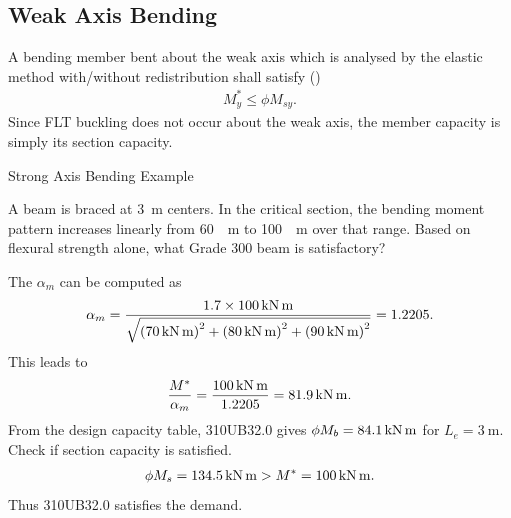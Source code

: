 \subsection{Weak Axis Bending}
A bending member bent about the weak axis which is analysed by the elastic method with/without redistribution shall satisfy ()
\begin{gather}
M^*_y\leqslant\phi{}M_{sy}.
\end{gather}
Since FLT buckling does not occur about the weak axis, the member capacity is simply its section capacity.
\begin{exmp}
Strong Axis Bending Example

A beam is braced at \SI{3}{\meter} centers.
In the critical section, the bending moment pattern increases linearly from \SI{60}{\kn\meter} to \SI{100}{\kn\meter} over that range.
Based on flexural strength alone, what Grade 300 beam is satisfactory?
\begin{figure}[H]

\end{figure}
\end{exmp}
\begin{solution}
The $\alpha_m$ can be computed as
\begin{gather*}
\alpha_m=\dfrac{1.7\times\SI{100}{\kilo\newton\meter}}{\sqrt{\left(\SI{70}{\kilo\newton\meter}\right)^2+\left(\SI{80}{\kilo\newton\meter}\right)^2+\left(\SI{90}{\kilo\newton\meter}\right)^2}}=1.2205.
\end{gather*}
This leads to
\begin{gather*}
\dfrac{M^*}{\alpha_m}=\dfrac{\SI{100}{\kilo\newton\meter}}{1.2205}=\SI{81.9}{\kilo\newton\meter}.
\end{gather*}
From the design capacity table, 310UB32.0 gives $\phi{}M_b=\SI{84.1}{\kilo\newton\meter}$ for $L_e=\SI{3}{\meter}$.
Check if section capacity is satisfied.
\begin{gather*}
\phi{}M_s=\SI{134.5}{\kilo\newton\meter}>M^*=\SI{100}{\kilo\newton\meter}.
\end{gather*}
Thus 310UB32.0 satisfies the demand.
\end{solution}

